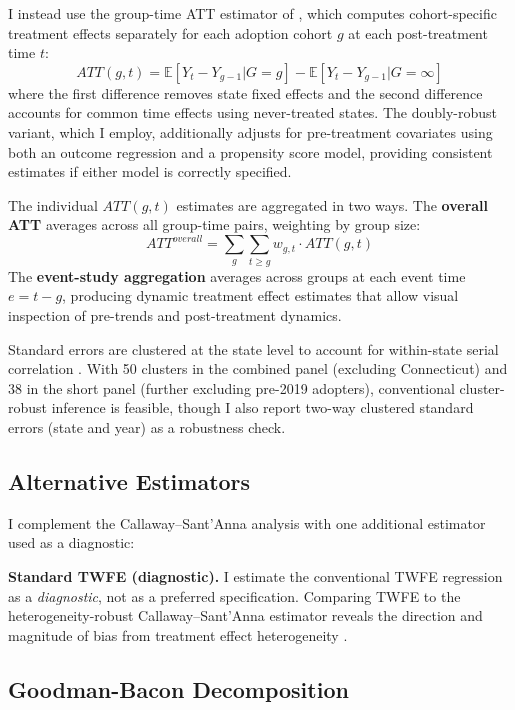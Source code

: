 \documentclass[12pt]{article}
\newcommand{\E}{\mathbb{E}}
\begin{document}
I instead use the group-time ATT estimator of \citet{callaway2021difference}, which computes cohort-specific treatment effects separately for each adoption cohort $g$ at each post-treatment time $t$:
\begin{equation}
ATT(g, t) = \E[Y_t - Y_{g-1} | G = g] - \E[Y_t - Y_{g-1} | G = \infty]
\end{equation}
where the first difference removes state fixed effects and the second difference accounts for common time effects using never-treated states. The doubly-robust variant, which I employ, additionally adjusts for pre-treatment covariates using both an outcome regression and a propensity score model, providing consistent estimates if either model is correctly specified.

The individual $ATT(g, t)$ estimates are aggregated in two ways. The \textbf{overall ATT} averages across all group-time pairs, weighting by group size:
\begin{equation}
ATT^{overall} = \sum_{g} \sum_{t \geq g} w_{g,t} \cdot ATT(g, t)
\end{equation}
The \textbf{event-study aggregation} averages across groups at each event time $e = t - g$, producing dynamic treatment effect estimates that allow visual inspection of pre-trends and post-treatment dynamics.

Standard errors are clustered at the state level to account for within-state serial correlation \citep{bertrand2004much}. With 50 clusters in the combined panel (excluding Connecticut) and 38 in the short panel (further excluding pre-2019 adopters), conventional cluster-robust inference is feasible, though I also report two-way clustered standard errors (state and year) as a robustness check.

\subsection{Alternative Estimators}

I complement the Callaway--Sant'Anna analysis with one additional estimator used as a diagnostic:

\textbf{Standard TWFE (diagnostic).} I estimate the conventional TWFE regression as a \textit{diagnostic}, not as a preferred specification. Comparing TWFE to the heterogeneity-robust Callaway--Sant'Anna estimator reveals the direction and magnitude of bias from treatment effect heterogeneity \citep{roth2023s}.

\subsection{Goodman-Bacon Decomposition}
\end{document}

